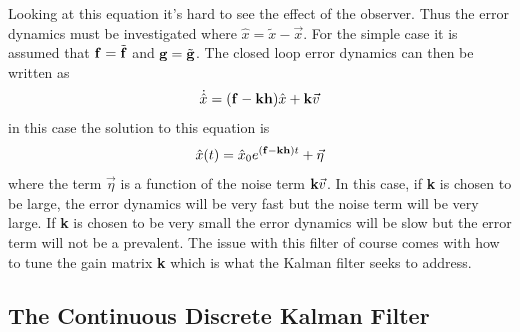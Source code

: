 \documentclass{article}
\begin{document}
Looking at this equation it's hard to see the effect of the
observer. Thus the error dynamics must be investigated where
$\hat{x}=\tilde{x}-\vec{x}$. For the simple case it is assumed that
${\bf f}=\tilde{{\bf f}}$ and ${\bf g}=\tilde{{\bf g}}$. The closed
loop error dynamics can then be written as
\begin{equation}
  \dot{\hat{x}} = ({\bf f} - {\bf k}{\bf h})\hat{x} + {\bf k}\vec{v}
\end{equation}
in this case the solution to this equation is
\begin{equation}
  \hat{x}(t) = \hat{x}_0e^{({\bf f} - {\bf k}{\bf h})t} + \vec{\eta}
\end{equation}
where the term $\vec{\eta}$ is a function of the noise term ${\bf
  k}\vec{v}$. In this case, if {\bf k} is chosen to be large, the
error dynamics will be very fast but the noise term will be very
large. If {\bf k} is chosen to be very small the error dynamics will
be slow but the error term will not be a prevalent. The issue with
this filter of course comes with how to tune the gain matrix {\bf k}
which is what the Kalman filter seeks to address.
    
\subsection{The Continuous Discrete Kalman Filter}
\end{document}
